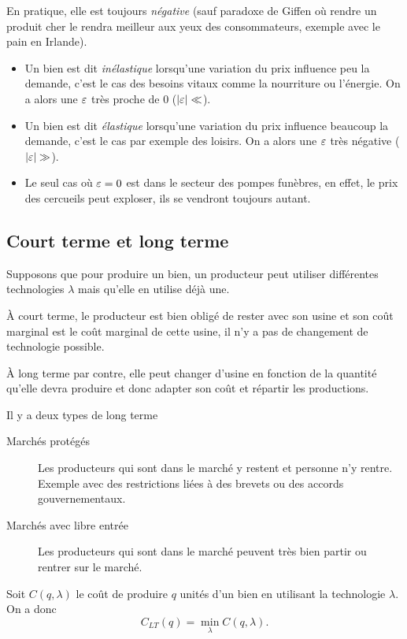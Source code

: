 En pratique, elle est toujours \emph{négative}
(sauf paradoxe de Giffen où rendre un produit cher le rendra meilleur aux yeux
des consommateurs, exemple avec le pain en Irlande).

\begin{itemize}
  \item Un bien est dit \emph{inélastique} lorsqu'une variation du prix
    influence peu la demande, c'est le cas des besoins vitaux comme la
    nourriture ou l'énergie. On a alors une $\varepsilon$ très proche de 0
    ($|\varepsilon| \ll$).
  \item Un bien est dit \emph{élastique} lorsqu'une variation du prix
    influence beaucoup la demande, c'est le cas par exemple des loisirs.
    On a alors une $\varepsilon$ très négative ($|\varepsilon| \gg$).
  \item Le seul cas où $\varepsilon = 0$ est dans le secteur des pompes
   funèbres, en effet, le prix des cercueils peut exploser,
   ils se vendront toujours autant.
\end{itemize}

\subsection{Court terme et long terme}
Supposons que pour produire un bien, un producteur peut utiliser
différentes technologies $\lambda$ mais qu'elle en utilise déjà une.

À court terme, le producteur est bien obligé de rester avec son usine
et son coût marginal est le coût marginal de cette usine, il n'y a pas
de changement de technologie possible.

À long terme par contre, elle peut changer d'usine en fonction de la quantité
qu'elle devra produire et donc adapter son coût et répartir les productions.


Il y a deux types de long terme
\begin{description}
  \item[Marchés protégés]
    Les producteurs qui sont dans le marché y restent et personne n'y rentre.
    Exemple avec des restrictions liées à des brevets ou des accords gouvernementaux.
  \item[Marchés avec libre entrée]
    Les producteurs qui sont dans le marché peuvent très bien partir ou rentrer sur le marché.
\end{description}

Soit $C(q,\lambda)$ le coût de produire $q$ unités d'un bien en utilisant
la technologie $\lambda$.
On a donc
\[ C_{LT}(q) = \min_\lambda C(q,\lambda). \]

